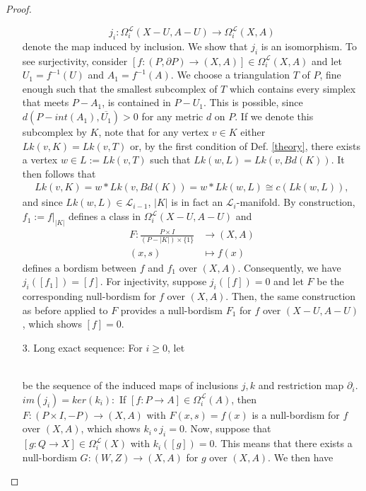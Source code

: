 \documentclass{scrreprt}
\begin{document}
\begin{proof}
\begin{itemize}
\begin{equation*}
j_i: \Omega_i^{\mathcal{L}}(X-U, A-U) \to \Omega_i^{\mathcal{L}}(X,A)
\end{equation*}
denote the map induced by inclusion. We show that $j_i$ is an isomorphism. To see surjectivity, consider $[f: (P, \partial P) \to (X,A)] \in \Omega_i^{\mathcal{L}}(X,A)$ and let $U_1 = f^{-1}(U)$ and $A_1= f^{-1}(A)$. We choose a triangulation $T$ of $P$, fine enough such that the smallest subcomplex of $T$ which contains every simplex that meets $P-A_1$, is contained in $P-U_1$. This is possible, since $d(P-int(A_1), \overline{U_1})>0$ for any metric $d$ on $P$. If we denote this subcomplex by $K$, note that for any vertex $v \in K$ either $Lk(v,K)=Lk(v,T)$ or, by the first condition of Def. \ref{theory}, there exists a vertex $w \in L:= Lk(v,T)$ such that $Lk(w,L)=Lk(v,Bd(K))$. It then follows that
\begin{align*}
Lk(v,K) = w * Lk(v,Bd(K)) = w * Lk(w,L) \cong c(Lk(w,L)),
\end{align*}
and since $Lk(w,L) \in \mathcal{L}_{i-1}$, $|K|$ is in fact an $\mathcal{L}_i$-manifold. By construction, \\ $f_1:=f|_{|K|}$ defines a class in $\Omega_i^{\mathcal{L}}(X-U,A-U)$ and 
\begin{align*}
F: \frac{P \times I}{ (P-|K|) \times \{ 1 \} } &\to (X,A) \\
(x,s) &\mapsto f(x)
\end{align*}
defines a bordism between $f$ and $f_1$ over $(X,A)$. Consequently, we have \\ $j_i ([f_1]) = [f]$. For injectivity, suppose $j_i([f])=0$ and let $F$ be the corresponding null-bordism for $f$ over $(X,A)$. Then, the same construction as before applied to $F$ provides a null-bordism $F_1$ for $f$ over $(X-U,A-U)$, which shows $[f]=0$.
\item[3.] Long exact sequence: For $i \geq 0$, let \\
\\
be the sequence of the induced maps of inclusions $j,k$ and restriction map $\partial_i$. \\
{$im(j_i) = ker(k_i):$} If $[f:P \to A] \in \Omega_i^{\mathcal{L}}(A)$, then $F: (P \times I, -P) \to (X,A)$ with $F(x,s)=f(x)$ is a null-bordism for $f$ over $(X,A)$, which shows $k_i \circ j_i = 0$. Now, suppose that $[g: Q \to X] \in \Omega_i^{\mathcal{L}}(X)$ with $k_i([g])=0$. This means that there exists a null-bordism $G: (W,Z) \to (X,A)$ for $g$ over $(X,A)$. We then have 

\end{itemize}
\end{proof}
\end{document}
